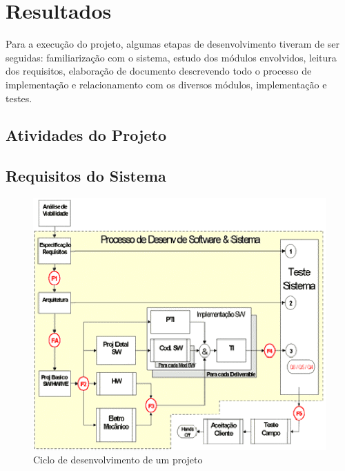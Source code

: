 \chapter{Resultados}

Para a execu\c{c}\~ao do projeto, algumas etapas de desenvolvimento tiveram de ser seguidas: familiariza\c{c}\~ao com o sistema, estudo dos módulos envolvidos, leitura dos requisitos, elabora\c{c}\~ao de documento descrevendo todo o processo de implementa\c{c}\~ao e relacionamento com os diversos m\'odulos, implementa\c{c}\~ao e testes.

\section{Atividades do Projeto}
\label{metodo3}

\section {Requisitos do Sistema}
\label{req}






\begin{figure}[htbp]
\centering
\includegraphics[scale=1.2]{Resultados/ciclodesenvolvimento.eps}
\caption{Ciclo de desenvolvimento de um projeto}
\label{CicloDesenvolvimento}
\end{figure}


